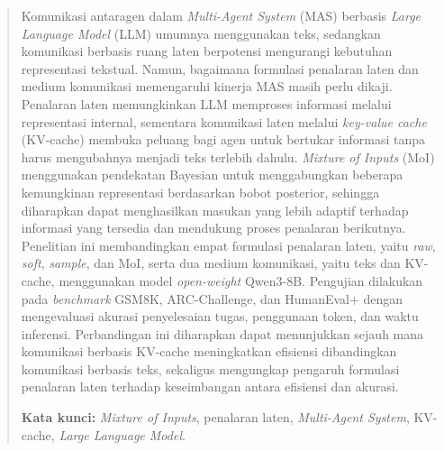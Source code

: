 
\begin{abstract}
Komunikasi antaragen dalam \textit{Multi-Agent System} (MAS) berbasis 
\textit{Large Language Model} (LLM) umumnya menggunakan teks, 
sedangkan komunikasi berbasis ruang laten berpotensi mengurangi kebutuhan 
representasi tekstual. Namun, bagaimana formulasi penalaran laten dan 
medium komunikasi memengaruhi kinerja MAS masih perlu dikaji. Penalaran laten 
memungkinkan LLM memproses informasi melalui representasi internal, 
sementara komunikasi laten melalui \textit{key-value cache} (KV-cache) membuka 
peluang bagi agen untuk bertukar informasi tanpa harus mengubahnya 
menjadi teks terlebih dahulu. \textit{Mixture of Inputs} (MoI) menggunakan 
pendekatan Bayesian untuk menggabungkan beberapa kemungkinan representasi 
berdasarkan bobot posterior, sehingga diharapkan dapat menghasilkan masukan 
yang lebih adaptif terhadap informasi yang tersedia dan mendukung proses penalaran berikutnya. 
Penelitian ini membandingkan empat formulasi penalaran laten, 
yaitu \textit{raw}, \textit{soft}, \textit{sample}, dan MoI, 
serta dua medium komunikasi, yaitu teks dan KV-cache, menggunakan 
model \textit{open-weight} Qwen3-8B. Pengujian dilakukan pada 
\textit{benchmark} GSM8K, ARC-Challenge, dan HumanEval+ dengan mengevaluasi 
akurasi penyelesaian tugas, penggunaan token, dan waktu inferensi. 
Perbandingan ini diharapkan dapat menunjukkan sejauh mana komunikasi 
berbasis KV-cache meningkatkan efisiensi dibandingkan komunikasi berbasis teks, 
sekaligus mengungkap pengaruh formulasi penalaran laten terhadap keseimbangan 
antara efisiensi dan akurasi.

\textbf{Kata kunci:} \textit{Mixture of Inputs}, penalaran laten, 
\textit{Multi-Agent System}, KV-cache, \textit{Large Language Model}.
\end{abstract}
